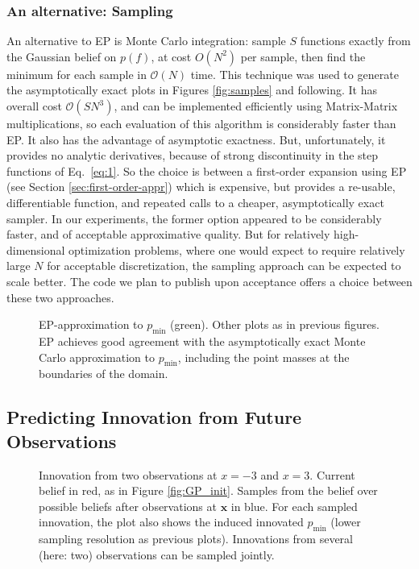 \documentclass[twoside,11pt]{article}
\newcommand{\vx}{\vec{x}}
\newcommand{\pmin}{p_{\min}}
\renewcommand{\vec}{\boldsymbol}
\renewcommand{\O}{\mathcal{O}}
\newcommand{\inputTikZ}[1]{%
 }
\newcommand{\inputTikZ}[1]{%
   \beginpgfgraphicnamed{#1-external}%
   \endpgfgraphicnamed%
 }
\begin{document}
\subsubsection{An alternative: Sampling}
\label{sec:an-altern-sampl}
An alternative to EP is Monte Carlo integration: sample $S$ functions
exactly from the Gaussian belief on $p(f)$, at cost $O(N^2)$ per
sample, then find the minimum for each sample in $\O(N)$ time. This
technique was used to generate the asymptotically exact plots in
Figures \ref{fig:samples} and following. It has overall cost
$\O(SN^3)$, and can be implemented efficiently using Matrix-Matrix
multiplications, so each evaluation of this algorithm is considerably
faster than EP. It also has the advantage of asymptotic
exactness. But, unfortunately, it provides no analytic derivatives,
because of strong discontinuity in the step functions of Eq.\
\eqref{eq:1}. So the choice is between a first-order expansion using
EP (see Section \ref{sec:first-order-appr}) which is expensive, but
provides a re-usable, differentiable function, and repeated calls to a
cheaper, asymptotically exact sampler. In our experiments, the former
option appeared to be considerably faster, and of acceptable
approximative quality. But for relatively high-dimensional
optimization problems, where one would expect to require relatively
large $N$ for acceptable discretization, the sampling approach can be
expected to scale better. The code we plan to publish upon acceptance
offers a choice between these two approaches.

\begin{figure}
  \centering
  \inputTikZ{figures/EP_pmin}
  \caption{EP-approximation to $\pmin$ (green). Other plots as in
    previous figures. EP achieves good agreement with the
    asymptotically exact Monte Carlo approximation to $\pmin$,
    including the point masses at the boundaries of the domain.}
  \label{fig:EP_toMC}
\end{figure}

\subsection{Predicting Innovation from Future Observations}
\label{sec:pred-innov-from}
\begin{figure}
  \centering
  \inputTikZ{figures/Innovation}
  \caption{ Innovation from two observations at $x=-3$ and
    $x=3$. Current belief in red, as in Figure
    \ref{fig:GP_init}. Samples from the belief over possible beliefs
    after observations at $\vx$ in blue. For each sampled innovation,
    the plot also shows the induced innovated $\pmin$ (lower sampling
    resolution as previous plots). Innovations from several (here:
    two) observations can be sampled jointly.}
  \label{fig:innovation}
\end{figure}
\end{document}
